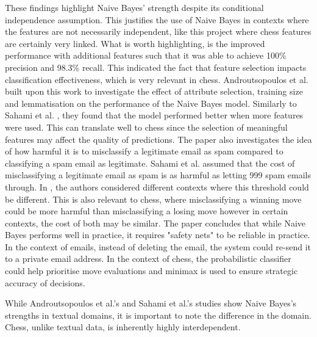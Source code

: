 These findings highlight Naive Bayes' strength despite its conditional independence assumption. This justifies the use of Naive Bayes in contexts where the features are not necessarily independent, like this project where chess features are certainly very linked. What is worth highlighting, is the improved performance with additional features such that it was able to achieve 100\% precision and 98.3\% recall. This indicated the fact that feature selection impacts classification effectiveness, which is very relevant in chess. Androutsopoulos et al. \cite{androutsopoulosEvaluationNaiveBayesian2000} built upon this work to investigate the effect of attribute selection, training size and lemmatisation on the performance of the Naive Bayes model. Similarly to Sahami et al. \cite{sahamiBayesianApproachFiltering}, they found that the model performed better when more features were used. This can translate well to chess since the selection of meaningful features may affect the quality of predictions. The paper also investigates the idea of how harmful it is to misclassify a legitimate email as spam compared to classifying a spam email as legitimate. Sahami et al. assumed that the cost of misclassifying a legitimate email as spam is as harmful as letting 999 spam emails through. In \cite{androutsopoulosEvaluationNaiveBayesian2000}, the authors considered different contexts where this threshold could be different. This is also relevant to chess, where misclassifying a winning move could be more harmful than misclassifying a losing move however in certain contexts, the cost of both may be similar. The paper concludes that while Naive Bayes performs well in practice, it requires "safety nets" to be reliable in practice. In the context of emails, instead of deleting the email, the system could re-send it to a private email address. In the context of chess, the probabilistic classifier could help prioritise move evaluations and minimax is used to ensure strategic accuracy of decisions. 

While Androutsopoulos et al.'s and Sahami et al.'s studies show Naive Bayes's strengths in textual domains, it is important to note the difference in the domain. Chess, unlike textual data, is inherently highly interdependent. 

